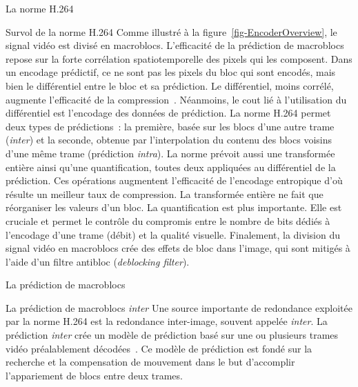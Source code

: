 \begin{chapter}{La norme H.264}
\begin{section}{Survol de la norme H.264}
Comme illustré à la figure~\ref{fig-EncoderOverview}, le signal vidéo est divisé
en macroblocs. L'efficacité de la prédiction de macroblocs repose sur la forte
corrélation spatiotemporelle des pixels qui les composent. Dans un encodage
prédictif, ce ne sont pas les pixels du bloc qui sont encodés, mais bien le
différentiel entre le bloc et sa prédiction. Le différentiel, moins corrélé,
augmente l'efficacité de la compression~\citep{Drew2004}. Néanmoins, le cout lié
à l'utilisation du différentiel est l'encodage des données de prédiction. La
norme H.264 permet deux types de prédictions~: la première, basée sur les blocs
d'une autre trame (\textit{inter}) et la seconde, obtenue par l'interpolation du
contenu des blocs voisins d'une même trame (prédiction \textit{intra}). La norme
prévoit aussi une transformée entière ainsi qu'une quantification, toutes deux
appliquées au différentiel de la prédiction. Ces opérations augmentent
l'efficacité de l'encodage entropique d'où résulte un meilleur taux de
compression. La transformée entière ne fait que réorganiser les valeurs d'un
bloc. La quantification est plus importante. Elle est cruciale et permet le
contrôle du compromis entre le nombre de bits dédiés à l'encodage d'une trame
(débit) et la qualité visuelle. Finalement, la division du signal vidéo en
macroblocs crée des effets de bloc dans l'image, qui sont mitigés à l'aide d'un
filtre antibloc (\textit{deblocking filter}).
\end{section}

\begin{section}{La prédiction de macroblocs}
\begin{subsection}{La prédiction de macroblocs \textit{inter}}
\newcommand{\ltC}[1]{\mathbf{C}_{#1}}
\newcommand{\ltR}[1]{\mathbf{R}_{#1}}
Une source importante de redondance exploitée par la norme H.264 est la
redondance inter-image, souvent appelée \textit{inter}. La prédiction
\textit{inter} crée un modèle de prédiction basé sur une ou plusieurs trames
vidéo préalablement décodées~\citep{richardson2003}. Ce modèle de prédiction est
fondé sur la recherche et la compensation de mouvement dans le but d'accomplir
l'appariement de blocs entre deux trames.


\end{subsection}
\end{section}
\end{chapter}
